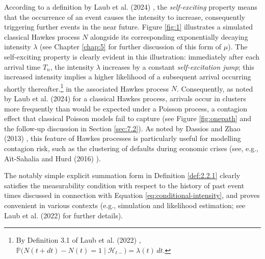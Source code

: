 \documentclass[12pt,a4paper]{report}
\theoremstyle{plain}
\theoremstyle{definition}
\theoremstyle{remark}
\newcommand{\1}{\mathbf{1}}
\begin{document}
\medskip
\noindent
According to a definition by Laub et al. (2024) \cite{LLPT24}, the \emph{self-exciting} property means that the occurrence of an event causes the intensity to increase, consequently triggering further events in the near future. Figure \ref{fig:1} illustrates a simulated classical Hawkes process $N$ alongside its corresponding exponentially decaying intensity $\lambda$ (see Chapter \ref{chap:5} for further discussion of this form of $\mu$). The self-exciting property is clearly evident in this illustration: immediately after each arrival time $T_n$, the intensity $\lambda$ increases by a constant \emph{self-excitation jump}; this increased intensity implies a higher likelihood of a subsequent arrival occurring shortly thereafter.\footnote{By Definition 3.1 of Laub et al. (2022) \cite{LLT22}, $\mathbb{P}\big( N(t+dt) - N(t) = 1 \mid \mathcal{H}_{t-} \big) = \lambda(t)\,dt$.} in the associated Hawkes process $N$. Consequently, as noted by Laub et al. (2024) \cite{LLPT24} for a classical Hawkes process, arrivals occur in clusters more frequently than would be expected under a Poisson process, a contagion effect that classical Poisson models fail to capture (see Figure \ref{fig:onepath} and the follow-up discussion in Section \ref{sec:7.2}). As noted by Dassios and Zhao (2013) \cite{DZ13}, this feature of Hawkes processes is particularly useful for modelling contagion risk, such as the clustering of defaults during economic crises (see, e.g., Aït-Sahalia and Hurd (2016) \cite{AH16}).

\medskip
\noindent
The notably simple explicit summation form in Definition \ref{def:2.2.1} clearly satisfies the measurability condition with respect to the history of past event times discussed in connection with Equation \eqref{eq:conditional-intensity}, and proves convenient in various contexts (e.g., simulation and likelihood estimation; see Laub et al. (2022) \cite{LLT22} for further details).
\end{document}
